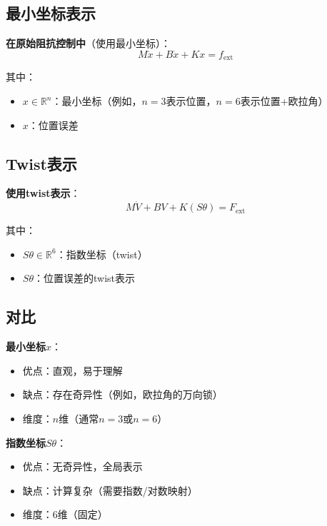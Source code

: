 \documentclass[12pt,a4paper]{article}
\begin{document}
\subsection{最小坐标表示}

\textbf{在原始阻抗控制中}（使用最小坐标）：
\begin{equation}
M\ddot{x} + B\dot{x} + Kx = f_{\text{ext}} \tag{11.64-minimal}
\end{equation}

其中：
\begin{itemize}
\item $x \in \mathbb{R}^n$：最小坐标（例如，$n=3$表示位置，$n=6$表示位置+欧拉角）
\item $x$：位置误差
\end{itemize}

\subsection{Twist表示}

\textbf{使用twist表示}：
\begin{equation}
M\dot{V} + BV + K(S\theta) = F_{\text{ext}} \tag{11.64-twist}
\end{equation}

其中：
\begin{itemize}
\item $S\theta \in \mathbb{R}^6$：指数坐标（twist）
\item $S\theta$：位置误差的twist表示
\end{itemize}

\subsection{对比}

\textbf{最小坐标$x$}：
\begin{itemize}
\item 优点：直观，易于理解
\item 缺点：存在奇异性（例如，欧拉角的万向锁）
\item 维度：$n$维（通常$n=3$或$n=6$）
\end{itemize}

\textbf{指数坐标$S\theta$}：
\begin{itemize}
\item 优点：无奇异性，全局表示
\item 缺点：计算复杂（需要指数/对数映射）
\item 维度：6维（固定）
\end{itemize}
\end{document}
